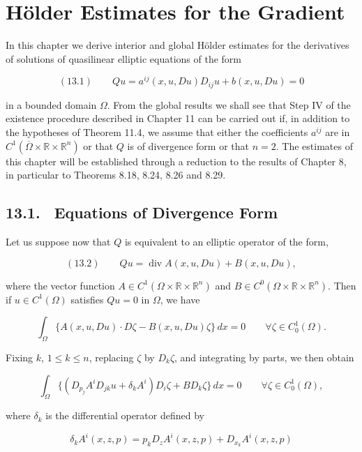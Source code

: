 \section*{H\"older Estimates for the Gradient}

In this chapter we derive interior and global H\"older estimates for the derivatives
of solutions of quasilinear elliptic equations of the form

\[
(13.1)\qquad Qu = a^{ij}(x,u,Du)D_{ij}u + b(x,u,Du) = 0
\]

in a bounded domain $\Omega$. From the global results we shall see that Step IV of the
existence procedure described in Chapter 11 can be carried out if, in addition
to the hypotheses of Theorem 11.4, we assume that either the coefficients $a^{ij}$ are in
$C^1(\overline{\Omega}\times\mathbb{R}\times\mathbb{R}^n)$ or that $Q$ is of divergence form or that $n=2$. The estimates of this
chapter will be established through a reduction to the results of Chapter 8, in
particular to Theorems 8.18, 8.24, 8.26 and 8.29.

\subsection*{13.1. \ Equations of Divergence Form}

Let us suppose now that $Q$ is equivalent to an elliptic operator of the form,

\[
(13.2)\qquad Qu = \operatorname{div} A(x,u,Du) + B(x,u,Du),
\]

where the vector function $A \in C^1(\Omega\times\mathbb{R}\times\mathbb{R}^n)$ and
$B \in C^0(\Omega\times\mathbb{R}\times\mathbb{R}^n)$. Then if $u \in C^1(\Omega)$ satisfies $Qu=0$ in $\Omega$, we have

\[
\int_{\Omega} \{A(x,u,Du)\cdot D\zeta - B(x,u,Du)\zeta\}\,dx = 0 \qquad \forall \zeta \in C_0^1(\Omega).
\]

Fixing $k$, $1\leq k\leq n$, replacing $\zeta$ by $D_k\zeta$, and integrating by parts, we then obtain

\[
\int_{\Omega} \{(D_{p_j}A^iD_{jk}u + \delta_kA^i)D_i\zeta + BD_k\zeta\}\,dx = 0 \qquad \forall \zeta \in C_0^1(\Omega),
\]

where $\delta_k$ is the differential operator defined by

\[
\delta_kA^i(x,z,p) = p_kD_zA^i(x,z,p) + D_{x_k}A^i(x,z,p)
\]
